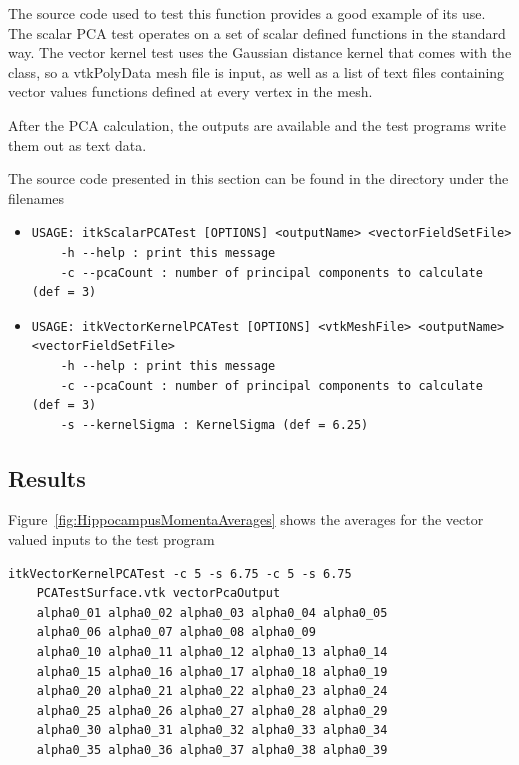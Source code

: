 \documentclass{InsightArticle}
\begin{document}
The source code used to test this function provides a good example of its
use.  The scalar PCA test operates on a set of scalar defined functions in
the standard way.  The vector kernel test uses the Gaussian distance kernel
that comes with the class, so a vtkPolyData mesh file is input, as well as
a list of text files containing vector values functions defined at every
vertex in the mesh.

After the PCA calculation, the outputs are available and the test programs
write them out as text data.

The source code presented in this section can be found in the 
directory under the filenames

\begin{itemize}
\item {}

\begin{verbatim}USAGE: itkScalarPCATest [OPTIONS] <outputName> <vectorFieldSetFile>
    -h --help : print this message
    -c --pcaCount : number of principal components to calculate (def = 3)
\end{verbatim}

\item {}

\begin{verbatim}USAGE: itkVectorKernelPCATest [OPTIONS] <vtkMeshFile> <outputName> <vectorFieldSetFile>
    -h --help : print this message
    -c --pcaCount : number of principal components to calculate (def = 3)
    -s --kernelSigma : KernelSigma (def = 6.25)
\end{verbatim}
\end{itemize}

\subsection{Results}

Figure~\ref{fig:HippocampusMomentaAverages} shows the averages for the vector
valued inputs to the test program

\begin{verbatim}itkVectorKernelPCATest -c 5 -s 6.75 -c 5 -s 6.75
    PCATestSurface.vtk vectorPcaOutput
    alpha0_01 alpha0_02 alpha0_03 alpha0_04 alpha0_05
    alpha0_06 alpha0_07 alpha0_08 alpha0_09
    alpha0_10 alpha0_11 alpha0_12 alpha0_13 alpha0_14
    alpha0_15 alpha0_16 alpha0_17 alpha0_18 alpha0_19
    alpha0_20 alpha0_21 alpha0_22 alpha0_23 alpha0_24
    alpha0_25 alpha0_26 alpha0_27 alpha0_28 alpha0_29
    alpha0_30 alpha0_31 alpha0_32 alpha0_33 alpha0_34
    alpha0_35 alpha0_36 alpha0_37 alpha0_38 alpha0_39
\end{verbatim}
\end{document}
